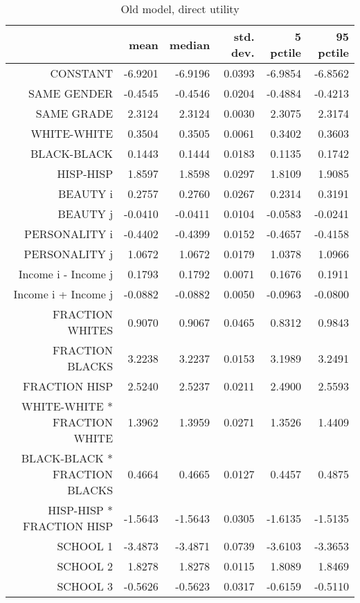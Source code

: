 \begin{table}[ht]
\caption{Old model, direct utility}
\centering
\begin{tabular}{rrrrrr}
  \hline
 & mean & median & std. dev. & 5 pctile & 95 pctile \\ 
  \hline
CONSTANT & -6.9201 & -6.9196 & 0.0393 & -6.9854 & -6.8562 \\ 
  SAME GENDER & -0.4545 & -0.4546 & 0.0204 & -0.4884 & -0.4213 \\ 
  SAME GRADE & 2.3124 & 2.3124 & 0.0030 & 2.3075 & 2.3174 \\ 
  WHITE-WHITE & 0.3504 & 0.3505 & 0.0061 & 0.3402 & 0.3603 \\ 
  BLACK-BLACK & 0.1443 & 0.1444 & 0.0183 & 0.1135 & 0.1742 \\ 
  HISP-HISP & 1.8597 & 1.8598 & 0.0297 & 1.8109 & 1.9085 \\ 
  BEAUTY i & 0.2757 & 0.2760 & 0.0267 & 0.2314 & 0.3191 \\ 
  BEAUTY j & -0.0410 & -0.0411 & 0.0104 & -0.0583 & -0.0241 \\ 
  PERSONALITY i & -0.4402 & -0.4399 & 0.0152 & -0.4657 & -0.4158 \\ 
  PERSONALITY j & 1.0672 & 1.0672 & 0.0179 & 1.0378 & 1.0966 \\ 
  Income i - Income j & 0.1793 & 0.1792 & 0.0071 & 0.1676 & 0.1911 \\ 
  Income i + Income j & -0.0882 & -0.0882 & 0.0050 & -0.0963 & -0.0800 \\ 
  FRACTION WHITES & 0.9070 & 0.9067 & 0.0465 & 0.8312 & 0.9843 \\ 
  FRACTION BLACKS & 3.2238 & 3.2237 & 0.0153 & 3.1989 & 3.2491 \\ 
  FRACTION HISP & 2.5240 & 2.5237 & 0.0211 & 2.4900 & 2.5593 \\ 
  WHITE-WHITE * FRACTION WHITE & 1.3962 & 1.3959 & 0.0271 & 1.3526 & 1.4409 \\ 
  BLACK-BLACK * FRACTION BLACKS & 0.4664 & 0.4665 & 0.0127 & 0.4457 & 0.4875 \\ 
  HISP-HISP * FRACTION HISP & -1.5643 & -1.5643 & 0.0305 & -1.6135 & -1.5135 \\ 
  SCHOOL 1 & -3.4873 & -3.4871 & 0.0739 & -3.6103 & -3.3653 \\ 
  SCHOOL 2 & 1.8278 & 1.8278 & 0.0115 & 1.8089 & 1.8469 \\ 
  SCHOOL 3 & -0.5626 & -0.5623 & 0.0317 & -0.6159 & -0.5110 \\ 

\end{tabular}
\end{table}

